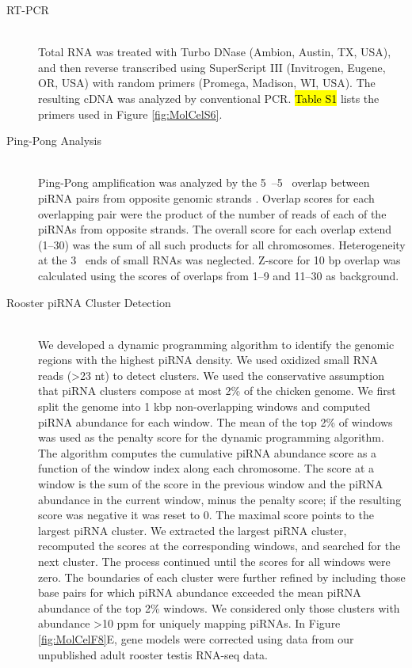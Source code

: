 \begin{description}
    \item[RT-PCR] \hfill \\
    Total RNA was treated with Turbo DNase (Ambion, Austin, TX, USA), and then reverse transcribed using SuperScript III (Invitrogen, Eugene, OR, USA) with random primers (Promega, Madison, WI, USA). The resulting cDNA was analyzed by conventional PCR. \hl{Table S1} lists the primers used in Figure \ref{fig:MolCelS6}.

    \item[Ping-Pong Analysis] \hfill \\
    Ping-Pong amplification was analyzed by the 5\textprime~–5\textprime~ overlap between piRNA pairs from opposite genomic strands \citep{Li2009a}. Overlap scores for each overlapping pair were the product of the number of reads of each of the piRNAs from opposite strands. The overall score for each overlap extend (1–30) was the sum of all such products for all chromosomes. Heterogeneity at the 3\textprime~ ends of small RNAs was neglected. Z-score for 10 bp overlap was calculated using the scores of overlaps from 1–9 and 11–30 as background.

    \item[Rooster piRNA Cluster Detection] \hfill \\
    We developed a dynamic programming algorithm to identify the genomic regions with the highest piRNA density. We used oxidized small RNA reads (>23 nt) to detect clusters. We used the conservative assumption that piRNA clusters compose at most 2\% of the chicken genome. We first split the genome into 1 kbp non-overlapping windows and computed piRNA abundance for each window. The mean of the top 2\% of windows was used as the penalty score for the dynamic programming algorithm. The algorithm computes the cumulative piRNA abundance score as a function of the window index along each chromosome. The score at a window is the sum of the score in the previous window and the piRNA abundance in the current window, minus the penalty score; if the resulting score was negative it was reset to 0. The maximal score points to the largest piRNA cluster. We extracted the largest piRNA cluster, recomputed the scores at the corresponding windows, and searched for the next cluster. The process continued until the scores for all windows were zero. The boundaries of each cluster were further refined by including those base pairs for which piRNA abundance exceeded the mean piRNA abundance of the top 2\% windows. We considered only those clusters with abundance >10 ppm for uniquely mapping piRNAs. In Figure \ref{fig:MolCelF8}E, gene models were corrected using data from our unpublished adult rooster testis RNA-seq data.

  	\end{description}

